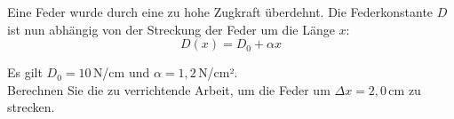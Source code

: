 \begin{ExerciseBlock}
Eine Feder wurde durch eine zu hohe Zugkraft überdehnt. Die Federkonstante $D$ ist nun abhängig von der Streckung der Feder um die Länge $x$:
\begin{equation*}
	D(x) = D_0 + \alpha x
\end{equation*}

Es gilt $D_0 = 10\,$N/cm und $\alpha = 1,2\,$N/cm². \\ Berechnen Sie die zu verrichtende Arbeit, um die Feder um $\Delta x=2,0\,$cm zu strecken.
\end{ExerciseBlock}
